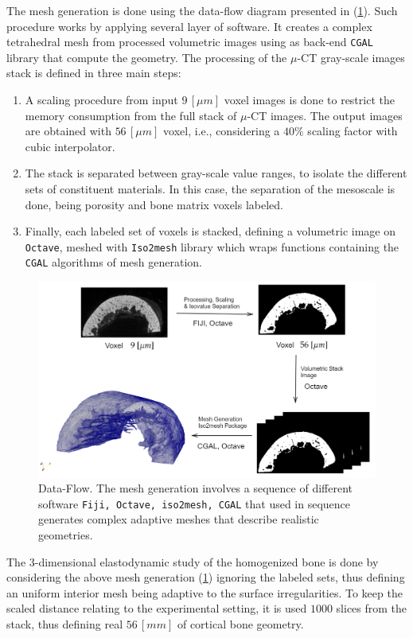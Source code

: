The mesh generation is done using the data-flow diagram presented in (\ref{DiagramMeshGeneration}). Such procedure works by applying several layer of software. It creates a complex tetrahedral mesh from processed volumetric images using as back-end \texttt{CGAL} library that compute the geometry. 
The processing of the $\mu$-CT gray-scale images stack is defined in three main steps:
\begin{enumerate}
    \item A scaling procedure from input $9 \, [\mu m]$ voxel images is done to restrict the memory consumption from the full stack of $\mu$-CT images. The output images are obtained with $56 \, [\mu m]$ voxel, i.e., considering a $40 \%$ scaling factor with cubic interpolator.
    \item The stack is separated between gray-scale value ranges, to isolate the different sets of constituent materials. In this case, the separation of the mesoscale is done, being porosity and bone matrix voxels labeled.
    \item Finally, each labeled set of voxels is stacked, defining a volumetric image on \texttt{Octave}, meshed with \texttt{Iso2mesh} library which wraps functions containing the \texttt{CGAL} algorithms of mesh generation.
\end{enumerate}
\begin{figure}[!h]
	\centering
	\includegraphics[scale=.5]{images/ImgExt/DiagramMeshGeneration.png}
	\caption{Data-Flow. The mesh generation involves a sequence of different software \texttt{Fiji, Octave, iso2mesh, CGAL} that used in sequence generates complex adaptive meshes that describe realistic geometries.}
	\label{DiagramMeshGeneration}
\end{figure} 

The 3-dimensional elastodynamic study of the homogenized bone is done by considering the above mesh generation (\ref{DiagramMeshGeneration}) ignoring the labeled sets, thus defining an uniform interior mesh being adaptive to the surface irregularities.
To keep the scaled distance relating to the experimental setting, it is used $1000$ slices from the stack, thus defining real $56 \, [mm]$ of cortical bone geometry.

